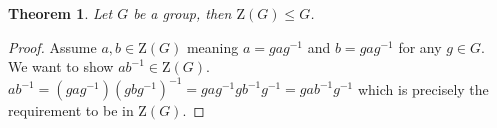 \documentclass[a4paper]{article}
\begin{document}
\newtheorem*{theorem4}{Theorem}

\begin{theorem4}
    Let \(G\) be a group, then \(\text{Z}(G) \leq G\).
\end{theorem4}
\begin{proof}
    Assume \(a, b \in \text{Z}(G)\) meaning \(a = gag^{-1}\) and \(b = gag^{-1}\) for any \(g \in G\). \\
    We want to show \(ab^{-1} \in \text{Z}(G)\).
    \(ab^{-1} = (gag^{-1}){(gbg^{-1})}^{-1} = gag^{-1}gb^{-1}g^{-1}
    = g ab^{-1} g^{-1}\) which is precisely the requirement to be in \(\text{Z}(G)\).
\end{proof}

\end{document}
